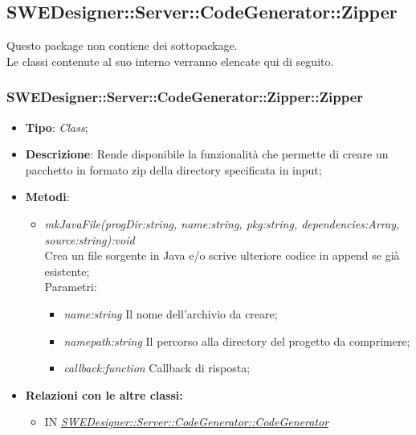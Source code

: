 \documentclass[../DefinizioneDiProdotto.tex]{subfiles}
\begin{document}
			
			
			
			
			\subsection{SWEDesigner::Server::CodeGenerator::Zipper}
			Questo package non contiene dei sottopackage.\\
			Le classi contenute al suo interno verranno elencate qui di seguito.
			
			\subsubsection{SWEDesigner::Server::CodeGenerator::Zipper::Zipper}
			\hypertarget{SWEDesigner::Server::CodeGenerator::Builder::Builder}{}
			\begin{itemize}
				\item \textbf{Tipo}: \emph{Class};
				\item \textbf{Descrizione}: Rende disponibile la funzionalità che permette di creare un pacchetto in formato zip della directory specificata in input; \\
				\item \textbf{Metodi}:
				\begin{itemize}
					\item \emph{mkJavaFile(progDir:string, name:string, pkg:string, dependencies:Array, source:string):void} \\ 
					Crea un file sorgente in Java e/o scrive ulteriore codice in append se già esistente; \\
					Parametri:
					\begin{itemize}
						\item \emph{name:string} Il nome dell'archivio da creare;
						\item \emph{namepath:string} Il percorso alla directory del progetto da comprimere;
						\item \emph{callback:function} Callback di risposta;
					\end{itemize}
				\end{itemize}
				
				\item \textbf{Relazioni con le altre classi:}
				\begin{itemize}
					\item IN \hyperlink{SWEDesigner::Server::CodeGenerator::CodeGenerator}{\emph{SWEDesigner::Server::CodeGenerator::CodeGenerator}}
				\end{itemize}	
			\end{itemize}
			
\end{document}

